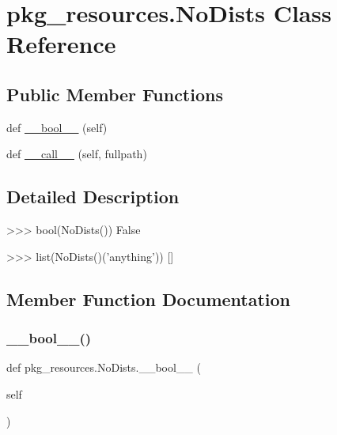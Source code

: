 \hypertarget{classpkg__resources_1_1NoDists}{}\section{pkg\+\_\+resources.\+No\+Dists Class Reference}
\label{classpkg__resources_1_1NoDists}
\subsection*{Public Member Functions}
\begin{DoxyCompactItemize}
\item 
def \hyperlink{classpkg__resources_1_1NoDists_ac23036682fc6952bfcd4ab3e238a1e9b}{\+\_\+\+\_\+bool\+\_\+\+\_\+} (self)
\item 
def \hyperlink{classpkg__resources_1_1NoDists_a58f3f227544be750eae7ffa18dc683f6}{\+\_\+\+\_\+call\+\_\+\+\_\+} (self, fullpath)
\end{DoxyCompactItemize}


\subsection{Detailed Description}
\begin{DoxyVerb}>>> bool(NoDists())
False

>>> list(NoDists()('anything'))
[]
\end{DoxyVerb}
 

\subsection{Member Function Documentation}
\mbox{\label{classpkg__resources_1_1NoDists_ac23036682fc6952bfcd4ab3e238a1e9b}} 
\subsubsection{\texorpdfstring{\+\_\+\+\_\+bool\+\_\+\+\_\+()}{\_\_bool\_\_()}}
{\footnotesize\ttfamily def pkg\+\_\+resources.\+No\+Dists.\+\_\+\+\_\+bool\+\_\+\+\_\+ (\begin{DoxyParamCaption}\item[{}]{self }\end{DoxyParamCaption})}

